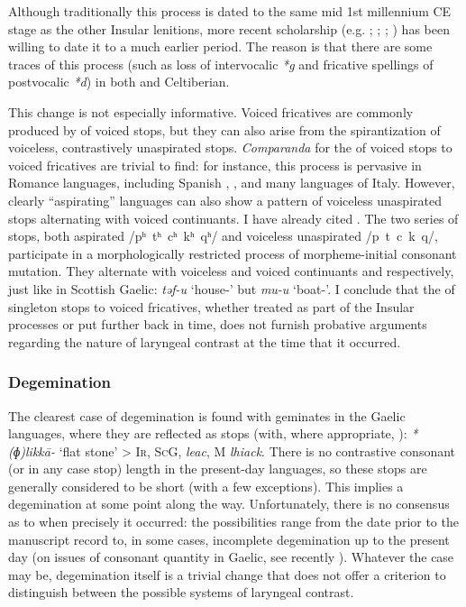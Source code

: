\documentclass[output=paper,colorlinks,citecolor=brown]{langscibook}
\begin{document}
Although traditionally this process is dated to the same mid 1st millennium CE stage as the other Insular lenitions, more recent scholarship (e.g. \cite{sims-williams90:_datin_neo_britt}; \cite{villar93:_las}; \cite{mccone}; \cite{eska2017})  has been willing to date it to a much earlier period. The reason is that there are some traces of this process (such as loss of intervocalic \textit{*g} and fricative spellings of postvocalic \textit{*d}) in both  and Celtiberian.

This change is not especially informative. Voiced fricatives are commonly produced by  of voiced stops, but they can also arise from the spirantization of voiceless, contrastively unaspirated stops. \emph{Comparanda} for the  of voiced stops to voiced fricatives are trivial to find: for instance, this process is pervasive in Romance languages, including Spanish , , and many languages of Italy. However, clearly \enquote{aspirating} languages can also show a pattern of  voiceless unaspirated stops alternating with voiced continuants. I have already cited . The two series of stops, both aspirated /pʰ~tʰ~cʰ~kʰ~qʰ/ and voiceless unaspirated /p~t~c~k~q/, participate in a morphologically restricted process of morpheme\hyp initial consonant mutation. They alternate with voiceless and voiced continuants \ipa{[f~r̥~s~x~χ]} and \ipa{[v~r~z~ɣ~ʁ]} respectively, just like in Scottish Gaelic: \textit{təf-u} `house-\Pl' but \textit{mu-u} `boat-\Pl'. I conclude that the  of singleton  stops to voiced fricatives, whether treated as part of the Insular  processes or put further back in time, does not furnish probative arguments regarding the nature of laryngeal contrast at the time that it occurred.

\subsubsection{Degemination}
\label{sec:degemination}

The clearest case of degemination is found with  geminates in the Gaelic languages, where they are reflected as  stops (with, where appropriate, ): \textit{*(ɸ)likkā-} `flat stone' > \textsc{Ir, ScG}, \textit{leac}, M \textit{lhiack}. There is no contrastive consonant (or in any case stop) length in the present\hyp day languages, so these stops are generally considered to be short (with a few exceptions). This implies a degemination at some point along the way. Unfortunately, there is no consensus as to when precisely it occurred: the possibilities range from the date prior to the manuscript record to, in some cases, incomplete degemination up to the present day (on issues of consonant quantity in Gaelic, see recently \cite{lewin2023preocclusion,stifter2023celtic,wheatley2022donegal}). Whatever the case may be, degemination itself is a trivial change that does not offer a criterion to distinguish between the possible systems of laryngeal contrast.
\end{document}
